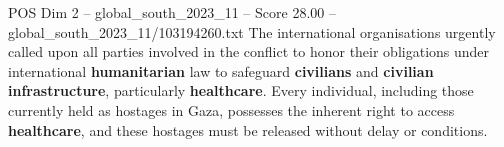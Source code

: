 \begin{textsample}{POS Dim 2 – global\_south\_2023\_11 – Score 28.00 – global\_south\_2023\_11/103194260.txt}
The international organisations urgently called upon all parties involved in the conflict to honor their obligations under international \textbf{humanitarian} law to safeguard \textbf{civilians} and \textbf{civilian} \textbf{infrastructure}, particularly \textbf{healthcare}.
Every individual, including those currently held as hostages in Gaza, possesses the inherent right to access \textbf{healthcare}, and these hostages must be released without delay or conditions.

\end{textsample}
